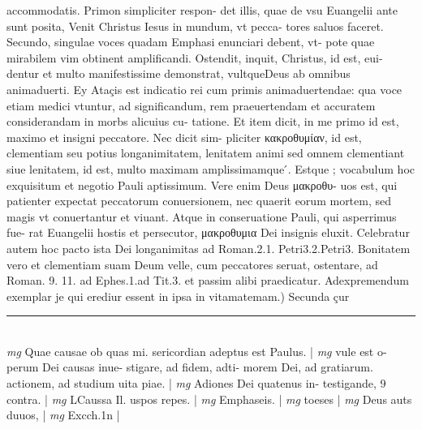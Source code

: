 \documentclass{article}
\begin{document}
\begin{pages}
accommodatis. Primon simpliciter respon- det illis, quae de vsu Euangelii ante sunt posita, Venit Christus Iesus in mundum, vt pecca- tores saluos faceret. Secundo, singulae voces quadam Emphasi enunciari debent, vt- pote quae mirabilem vim obtinent amplificandi. Ostendit, inquit, Christus, id est, eui- dentur et multo manifestissime demonstrat, vultqueDeus ab omnibus animaduerti. Ey Ataçis est indicatio rei cum primis animaduertendae: qua voce etiam medici vtuntur, ad significandum, rem praeuertendam et accuratem considerandam in morbs alicuius cu- tatione. Et item dicit, in me primo id est, maximo et insigni peccatore. Nec dicit sim- pliciter κακροθυμίαν, id est, clementiam seu potius longanimitatem, lenitatem animi sed omnem clementiant siue lenitatem, id est, multo maximam amplissimamque ́. Estque ; vocabulum hoc exquisitum et negotio Pauli aptissimum. Vere enim Deus μακροθυ- uos est, qui patienter expectat peccatorum conuersionem, nec quaerit eorum mortem, sed magis vt conuertantur et viuant. Atque  in conseruatione Pauli, qui asperrimus fue- rat Euangelii hostis et persecutor, μακροθυμια Dei insignis eluxit. Celebratur autem hoc pacto ista Dei longanimitas ad Roman.2.1. Petri3.2.Petri3. Bonitatem vero et clementiam suam Deum velle, cum peccatores seruat, ostentare, ad Roman. 9. 11. ad Ephes.1.ad Tit.3. et passim alibi praedicatur.  \pend\pstart Adexpremendum exemplar je qui erediur essent in ipsa in vitamatemam.) Secunda çur  \pend
\vspace{0.5cm}\noindent
\vspace{0.2cm}\rule{1cm}{0.2pt}\\ 
\hspace{0.2cm}\textit{mg}
\footnotesize Quae causae ob quas mi. sericordian adeptus est Paulus. 
\normalsize| 
\hspace{0.2cm}\textit{mg}
\footnotesize vule est o- perum Dei causas inue- stigare, ad fidem, adti- morem Dei, ad gratiarum. actionem, ad studium uita piae. 
\normalsize| 
\hspace{0.2cm}\textit{mg}
\footnotesize Adiones Dei quatenus in- testigande, 9 contra. 
\normalsize| 
\hspace{0.2cm}\textit{mg}
\footnotesize LCaussa Il. uspos repes. 
\normalsize| 
\hspace{0.2cm}\textit{mg}
\footnotesize Emphaseis. 
\normalsize| 
\hspace{0.2cm}\textit{mg}
\footnotesize toeses 
\normalsize| 
\hspace{0.2cm}\textit{mg}
\footnotesize Deus auts duuos, 
\normalsize| 
\hspace{0.2cm}\textit{mg}
\footnotesize Excch.1n 
\normalsize| 

\end{pages}
\end{document}
